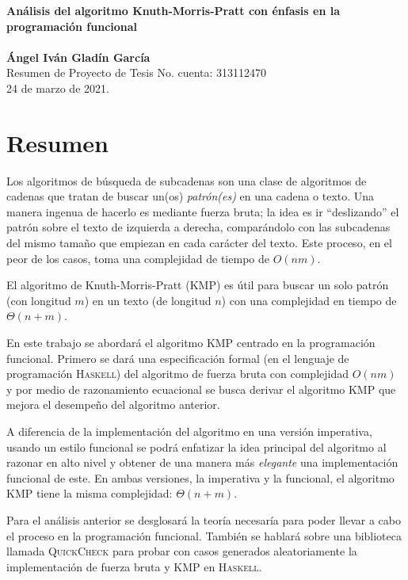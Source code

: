\documentclass[letterpaper,11pt]{article}
\begin{document}
\noindent
\large
\textbf{Análisis del algoritmo Knuth-Morris-Pratt con énfasis en la programación funcional} \\\\
\textbf{Ángel Iván Gladín García} \\
\normalsize Resumen de Proyecto de Tesis       \hfill No. cuenta: 313112470\\
\hfill 24 de marzo de 2021.\\

\vspace*{-15pt}

\section{Resumen}
Los algoritmos de búsqueda de subcadenas son una clase de algoritmos de cadenas que tratan de
buscar un(os) \emph{patrón(es)} en una cadena o texto.
Una manera ingenua de hacerlo es mediante fuerza bruta; la idea es ir ``deslizando'' el patrón
sobre el texto de izquierda a derecha, comparándolo con las subcadenas del mismo tamaño que
empiezan en cada carácter del texto. Este proceso, en el peor de los casos, toma una complejidad
de tiempo de $O(nm)$.

El algoritmo de Knuth-Morris-Pratt (KMP) es útil para buscar un solo patrón (con longitud $m$) en
un texto (de longitud $n$) con una complejidad en tiempo de $\Theta(n + m)$. 

En este trabajo se abordará el algoritmo KMP centrado en la programación funcional.
Primero se dará una especificación formal (en el lenguaje de programación \textsc{Haskell}) del
algoritmo de fuerza bruta con complejidad $O(nm)$ y por medio de razonamiento ecuacional se busca 
derivar el algoritmo KMP que mejora el desempeño del algoritmo anterior.

A diferencia de la implementación del algoritmo en una versión imperativa, usando un estilo
funcional se podrá enfatizar la idea principal del algoritmo al razonar en alto nivel y obtener 
de una manera más \textit{elegante} una implementación funcional de este. 
En ambas versiones, la imperativa y la funcional, el algoritmo KMP tiene la misma 
complejidad: $\Theta(n + m)$.

Para el análisis anterior se desglosará la teoría necesaría para poder llevar a cabo el proceso
en la programación funcional. También se hablará sobre una biblioteca llamada \textsc{QuickCheck}
para probar con casos generados aleatoriamente la implementación de fuerza bruta y KMP en
\textsc{Haskell}.
\end{document}
